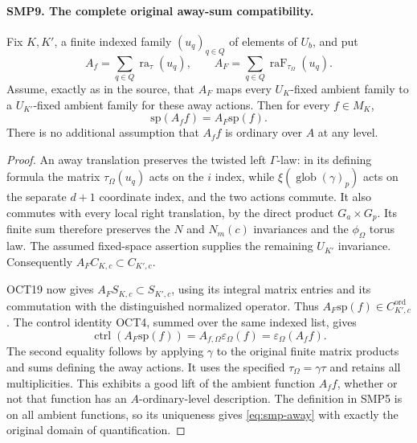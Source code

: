 \paragraph{SMP9. The complete original away-sum compatibility.}
\label{claim:SMP9}
Fix $K,K'$, a finite indexed family $(u_q)_{q\in Q}$
of elements of $U_b$, and put
\[
 A_f=\sum_{q\in Q}\operatorname{ra}_{\tau}(u_q),
 \qquad A_F=\sum_{q\in Q}
                      \operatorname{raF}_{\tau_\Omega}(u_q).
\]
Assume, exactly as in the source, that $A_F$ maps
every $U_K$-fixed ambient family to a $U_{K'}$-fixed
ambient family for these away actions.  Then for
every $f\in M_K$,
\begin{equation}\label{eq:smp-away}
                   \mathrm{sp}(A_f f)=A_F\mathrm{sp}(f).
\end{equation}
There is no additional assumption that $A_f f$ is
ordinary over $A$ at any level.
\begin{proof}
An away translation preserves the twisted left
$\Gamma$-law: in its defining formula the matrix
$\tau_\Omega(u_q)$ acts on the $i$ index, while
$\xi(\operatorname{glob}(\gamma)_p)$ acts on the
separate $d+1$ coordinate index, and the two actions
commute.  It also commutes with every local right
translation, by the direct product $G_a\times G_p$.
Its finite sum therefore preserves the $N$ and
$N_m(c)$ invariances and the $\phi_\Omega$ torus law.
The assumed fixed-space assertion supplies the
remaining $U_{K'}$ invariance.  Consequently
$A_F C_{K,c}\subset C_{K',c}$.

OCT19 now gives
$A_F S_{K,c}\subset S_{K',c}$, using its integral
matrix entries and its commutation with the
distinguished normalized operator.  Thus
$A_F\mathrm{sp}(f)\in C^{\mathrm{ord}}_{K',c}$.
The control identity OCT4, summed over the same
indexed list, gives
\[
 \operatorname{ctrl}(A_F\mathrm{sp}(f))
       =A_{f,\Omega}\varepsilon_\Omega(f)
       =\varepsilon_\Omega(A_f f).
\]
The second equality follows by applying $\gamma$
to the original finite matrix products and sums
defining the away actions.  It uses the specified
$\tau_\Omega=\gamma\tau$ and retains all multiplicities.
This exhibits a good lift of the ambient function
$A_f f$, whether or not that function has an
$A$-ordinary-level description.  The definition in
SMP5 is on all ambient functions, so its uniqueness
gives \eqref{eq:smp-away} with exactly the original
domain of quantification.
\end{proof}

